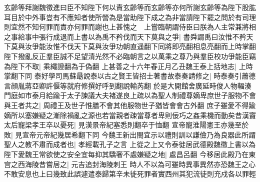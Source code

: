 玄齡等拜謝魏徵進曰臣不知陛下何以責玄齡等而玄齡等亦何所謝玄齡等為陛下股肱耳目於中外事豈有不應知者使所營為是當助陛下成之為非當請陛下罷之問於有司理則宜然不知何罪而責亦何罪而謝也上甚愧之　上嘗臨朝謂侍臣曰朕為人主常兼將相之事給事中張行成退而上書以為禹不矜伐而天下莫與之爭|{
	書舜謂禹曰汝惟不矜天下莫與汝爭能汝惟不伐天下莫與汝爭功朝直遥翻下同將即亮翻相息亮翻而上時掌翻}
陛下撥亂反正羣臣誠不足望清光然不必臨朝言之以萬乘之尊乃與羣臣校功爭能臣竊為陛下不取|{
	乘繩證翻為于偽翻}
上甚善之十六年春正月乙丑魏王泰上括地志|{
	上時掌翻下同}
泰好學司馬蘇朂說泰以古之賢王皆招士著書故泰奏請修之|{
	時泰奏引蕭德言顔胤蔣亞卿許偃等就府修撰好呼到翻說輸芮翻}
於是大開館舍廣延時俊人物輻湊門庭如市泰月給踰于太子諫議大夫褚遂良上疏以為聖人制禮尊嫡卑庶世子服物不會與王者共之|{
	周禮王及世子惟膳不會其他服物世子猶皆會會古外翻}
庶子雖愛不得踰嫡所以塞嫌疑之漸除禍亂之源也若當親者疎當尊者卑則佞巧之姦乘機而動矣昔漢竇太后寵梁孝王卒以憂死|{
	見漢景帝紀塞悉則翻卒于恤翻}
宣帝寵淮陽憲王亦幾至於敗|{
	見宣帝元帝紀幾居希翻下同}
今魏王新出閤宜示以禮則訓以謙儉乃為良器此所謂聖人之教不肅而成者也|{
	孝經載孔子之言}
上從之上又令泰徙居武德殿魏徵上書以為陛下愛魏王常欲使之安全宜每抑其驕奢不處嫌疑之地|{
	處昌呂翻}
今移居此殿乃在東宫之西海陵昔嘗居之|{
	元吉追封海陵刺王}
時人不以為可雖時異事異然亦恐魏王之心不敢安息也上曰幾致此誤遽遣泰歸第辛未徙死罪者實西州其犯流徒則充戍各以罪輕

